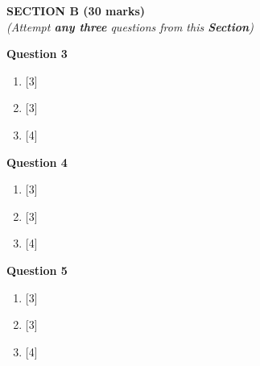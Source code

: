 \newpage
\begin{center}
   \large
   \textbf{SECTION B (30 marks)}\\
   \vspace{5mm}
   \normalsize
   \textit{(Attempt \textbf{any three} questions from this \textbf{Section})}
\end{center}
\par

\noindent
\textbf{Question 3}
\begin{enumerate}[label=(\roman*)]

    \item  \hfill [3]

    \item  \hfill [3]

    \item  \hfill [4]

\end{enumerate}

\noindent
\textbf{Question 4}
\begin{enumerate}[label=(\roman*)]

    \item  \hfill [3]

    \item  \hfill [3]

    \item  \hfill [4]

\end{enumerate}

\noindent
\textbf{Question 5}
\begin{enumerate}[label=(\roman*)]

    \item  \hfill [3]

    \item  \hfill [3]

    \item  \hfill [4]

\end{enumerate}

